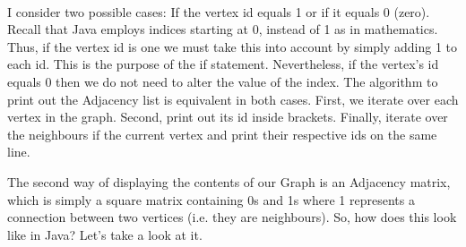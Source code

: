 \documentclass[letterpaper, 10pt]{article}
\begin{document}
\\
I consider two possible cases: If the vertex id equals 1 or if it equals 0 (zero). Recall that Java employs indices starting at 0, instead of 1 as in mathematics. Thus, if the vertex id is one we must take this into account by simply adding 1 to each id. This is the purpose of the if statement. Nevertheless, if the vertex's id equals 0 then we do not need to alter the value of the index. The algorithm to print out the Adjacency list is equivalent in both cases. First, we iterate over each vertex in the graph. Second, print out its id inside brackets. Finally, iterate over the neighbours if the current vertex and print their respective ids on the same line.

The second way of displaying the contents of our Graph is an Adjacency matrix, which is simply a square matrix containing 0s and 1s where 1 represents a connection between two vertices (i.e. they are neighbours). So, how does this look like in Java? Let's take a look at it.
\\
\end{document}
